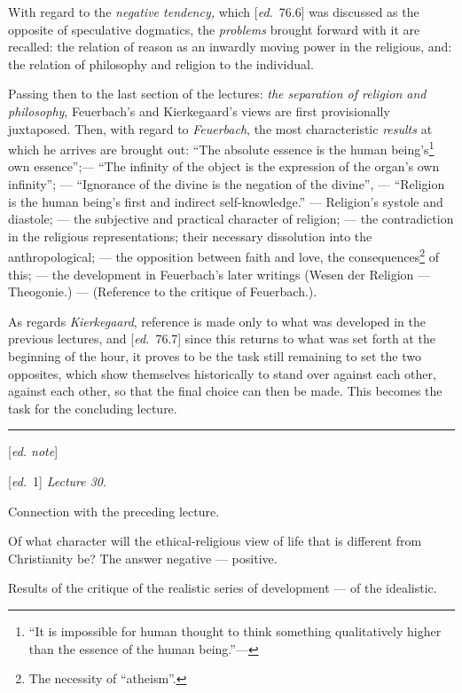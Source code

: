 \documentclass[12pt,a4paper,openany]{book}
\newcommand{\kpage}[1]{\marginnote{\footnotesize\textit{[#1]}}}
\newcommand{\ed}[1]{{\small[\textit{ed.}\ #1]}}
\newcommand{\ednote}[1]{{\small[\textit{ed. note}]}}
\newcommand{\sepline}{\par\begin{center}\rule{2cm}{0.4pt}\end{center}\par}
\begin{document}
With regard to the \emph{negative tendency,} which \ed{76.6} was discussed as
the opposite of speculative dogmatics, the \emph{problems} brought forward
with it are recalled: the relation of reason as an inwardly moving
power in the religious, and: the relation of philosophy and religion to
the individual.

\kpage{179}Passing then to the last section of the lectures:
\emph{the separation of religion and philosophy}, Feuerbach's and Kierkegaard's
views are first provisionally juxtaposed. Then, with regard
to \emph{Feuerbach}, the most characteristic \emph{results} at which he
arrives are brought out: ``The absolute essence is the human being's\footnote[141]{``It is impossible for human thought to think something qualitatively higher than the essence of the human being.''---} own essence'';---
``The infinity of the object is the expression of the organ's own infinity'';
--- ``Ignorance of the divine is the negation
of the divine'', --- ``Religion is the human being's first
and indirect self-knowledge.'' --- Religion's systole and diastole;
--- the subjective and practical character of religion; --- the contradiction
in the religious representations; their necessary dissolution into the
anthropological; --- the opposition between faith and love,
the consequences\footnote[142]{The necessity of ``atheism''.} of this; --- the development in Feuerbach's later
writings (Wesen der Religion --- Theogonie.) --- (Reference to the critique
of Feuerbach.).

As regards \emph{Kierkegaard}, reference is made only to what was developed in the previous lectures,
and \ed{76.7} since this returns to what was set forth
at the beginning of the hour, it proves to be the task still
remaining to set the two opposites, which show themselves
historically to stand over against each other, against each other, so that the
final choice can then be made. This becomes the task for the concluding lecture.

\sepline

\ednote{}

\ed{1} \emph{Lecture 30}.

Connection with the preceding lecture.

Of what character will the ethical-religious view of life that is different from Christianity
be? The answer negative --- positive.

Results of the critique of the realistic series of development --- of the
idealistic.
\end{document}
